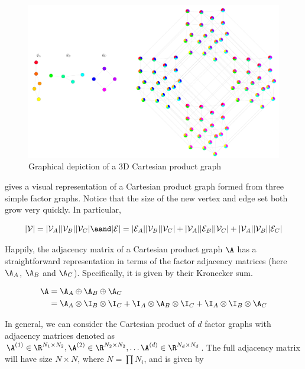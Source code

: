 \begin{figure}[t]
    \begin{center}
        \includegraphics[width=\linewidth]{Figures/3D_CPG.pdf}
    \end{center}
    \caption[Graphical depiction of a 3D Cartesian product graph]{Graphical depiction of a 3D Cartesian product graph}
    \label{fig:3D_CPG}
\end{figure}

 gives a visual representation of a Cartesian product graph formed from three simple factor graphs. Notice that the size of the new vertex and edge set both grow very quickly. In particular, 

$$
|\mathcal{V}| = |\mathcal{V}_A| |\mathcal{V}_B| |\mathcal{V}_C| \aand |\mathcal{E}| =  |\mathcal{E}_A| |\mathcal{V}_B| |\mathcal{V}_C| + |\mathcal{V}_A| |\mathcal{E}_B| |\mathcal{V}_C| + |\mathcal{V}_A| |\mathcal{V}_B| |\mathcal{E}_C|
$$

Happily, the adjacency matrix of a Cartesian product graph $\A$ has a straightforward representation in terms of the factor adjacency matrices (here $\A_A$, $\A_B$ and $\A_C$). Specifically, it is given by their Kronecker sum. 

\begin{align}
    \A &= \A_A \oplus \A_B \oplus \A_C \notag \\
    &= \A_A \otimes \I_B \otimes \I_C  + \I_A \otimes \A_B \otimes \I_C + \I_A \otimes \I_B \otimes \A_C
\end{align}

In general, we can consider the Cartesian product of $d$ factor graphs with adjacency matrices denoted as $\A^{(1)} \in \R^{N_1 \times N_2}, \A^{(2)} \in \R^{N_2 \times N_2}, \dots \A^{(d)} \in \R^{N_d \times N_d}$. The full adjacency matrix will have size $N \times N$, where $N = \prod N_i$, and is given by  

